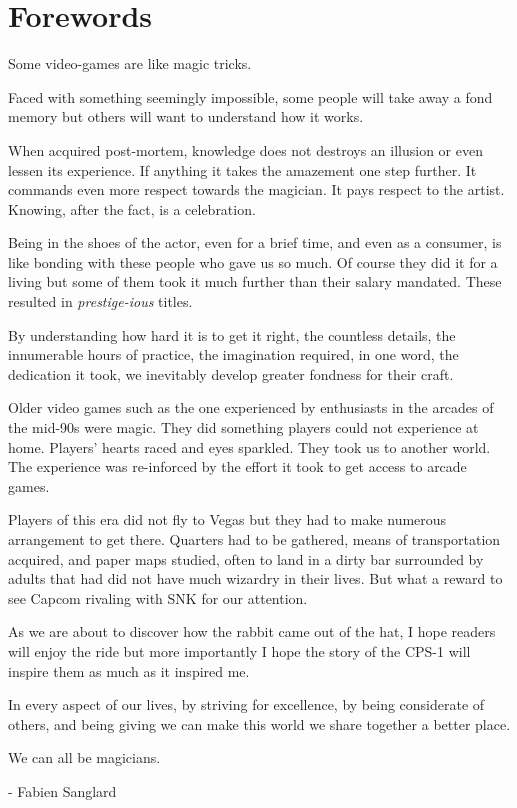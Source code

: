 \chapter{Forewords}

Some video-games are like magic tricks.

Faced with something seemingly impossible, some people will take away a fond memory but others will want to understand
how it works.

When acquired post-mortem, knowledge does not destroys an illusion or even lessen its experience. If anything it takes the amazement 
one step further. It commands even more respect towards the magician. It pays respect to the artist. Knowing, after the fact, is a celebration.  

Being in the shoes of the actor, even for a brief time, and even as a consumer, is like bonding with these people who gave us so much. Of course they did it for a living but some of them took it much further than their salary mandated. These resulted in \emph{prestige-ious} titles.

By understanding how hard it is to get it right, the countless details, the innumerable hours of practice, the imagination required, in one word, the dedication it took, we inevitably develop greater fondness for their craft.

Older video games such as the one experienced by enthusiasts in the arcades of the mid-90s were magic. They did something players could not experience at home. Players' hearts raced and eyes sparkled. They took us to another world. The experience was re-inforced by the effort it took to get access to arcade games. 

Players of this era did not fly to Vegas but they had to make numerous arrangement to get there. Quarters had to be gathered,  means of transportation acquired, and paper maps studied, often to land in a dirty bar surrounded by adults that had did not have much wizardry in their lives. But what a reward to see Capcom rivaling with SNK for our attention. 

As we are about to discover how the rabbit came out of the hat, I hope readers will enjoy the ride but more importantly I hope the story of the CPS-1 will inspire them as much as it inspired me.

In every aspect of our lives, by striving for excellence, by being considerate of others, and being giving we can make this world we share together a better place. 

We can all be magicians.

- Fabien Sanglard
